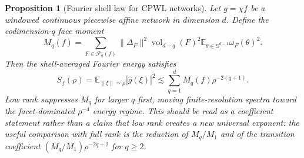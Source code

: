 \documentclass{article}
\newtheorem{proposition}[theorem]{Proposition}
\newcommand{\E}{\mathbb{E}}
\newcommand{\wh}{\widehat}
\begin{document}
\begin{proposition}[Fourier shell law for CPWL networks]
\label{prop:shell-law}
Let $g=\chi f$ be a windowed continuous piecewise affine network in dimension $d$. Define the codimension-$q$ face moment
\begin{equation}
M_q(f)=
\sum_{F\in\mathcal F_q(f)}
\|\Delta_F\|^2
\operatorname{vol}_{d-q}(F)^2
\E_{\theta\in\mathbb S^{d-1}}\omega_F(\theta)^2 .
\end{equation}
Then the shell-averaged Fourier energy satisfies
\begin{equation}
S_f(\rho)=\E_{\|\xi\|\simeq \rho}|\wh g(\xi)|^2
\lesssim
\sum_{q=1}^d M_q(f)\rho^{-2(q+1)}.
\label{eq:shell-law}
\end{equation}
Low rank suppresses $M_q$ for larger $q$ first, moving finite-resolution spectra toward the facet-dominated $\rho^{-4}$ energy regime. This should be read as a coefficient statement rather than a claim that low rank creates a new universal exponent: the useful comparison with full rank is the reduction of $M_q/M_1$ and of the transition coefficient $(M_q/M_1)\rho^{-2q+2}$ for $q\ge2$.
\end{proposition}
\end{document}
